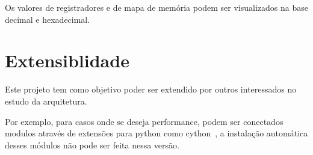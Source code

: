 	Os valores de registradores e de mapa de memória podem ser visualizados na base decimal e hexadecimal.


\section{Extensiblidade}

	Este projeto tem como objetivo poder ser extendido por outros interessados no estudo da arquitetura. 

	Por exemplo, para casos onde se deseja performance, podem ser conectados modulos através de extensões para python como cython~\cite{cython_home}, a instalação automática desses módulos não pode ser feita nessa versão.
